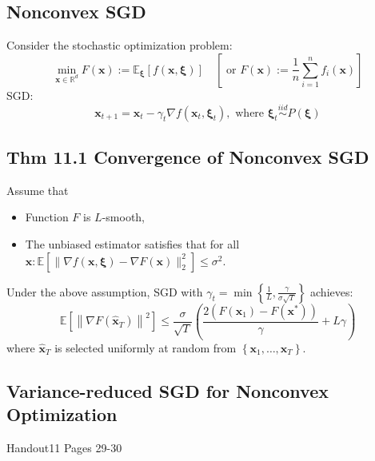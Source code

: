 \subsection*{Nonconvex SGD}
Consider the stochastic optimization problem:
$$
\min _{\mathbf{x} \in \mathbb{R}^{d}} F(\mathbf{x}):=\mathbb{E}_{\boldsymbol{\xi}}[f(\mathbf{x}, \boldsymbol{\xi})] \quad\left[\text { or } F(\mathbf{x}):=\frac{1}{n} \sum_{i=1}^{n} f_{i}(\mathbf{x})\right]
$$
SGD:
$$
\mathbf{x}_{t+1}=\mathbf{x}_{t}-\gamma_{t} \nabla f\left(\mathbf{x}_{t}, \boldsymbol{\xi}_{t}\right), \text { where } \boldsymbol{\xi}_{t} \stackrel{i i d}{\sim} P(\boldsymbol{\xi})
$$



\subsection*{Thm 11.1 Convergence of Nonconvex SGD}
Assume that 
\begin{itemize}[leftmargin=*]
    \item Function $F$ is $L$-smooth,
    \item The unbiased estimator satisfies that for all $\mathbf{x}: \mathbb{E}\left[\|\nabla f(\mathbf{x}, \boldsymbol{\xi})-\nabla F(\mathbf{x})\|_{2}^{2}\right] \leq \sigma^{2}$.
\end{itemize}

Under the above assumption, SGD with $\gamma_{t}=\min \left\{\frac{1}{L}, \frac{\gamma}{\sigma \sqrt{T}}\right\}$ achieves:
$$
\mathbb{E}\left[\left\|\nabla F\left(\hat{\mathbf{x}}_{T}\right)\right\|^{2}\right] \leq \frac{\sigma}{\sqrt{T}}\left(\frac{2\left(F\left(\mathbf{x}_{1}\right)-F\left(\mathbf{x}^{*}\right)\right)}{\gamma}+L \gamma\right)
$$
where $\hat{\mathbf{x}}_{T}$ is selected uniformly at random from $\left\{\mathbf{x}_{1}, \ldots, \mathbf{x}_{T}\right\}$.



\subsection*{Variance-reduced SGD for Nonconvex Optimization}
Handout11 Pages 29-30




